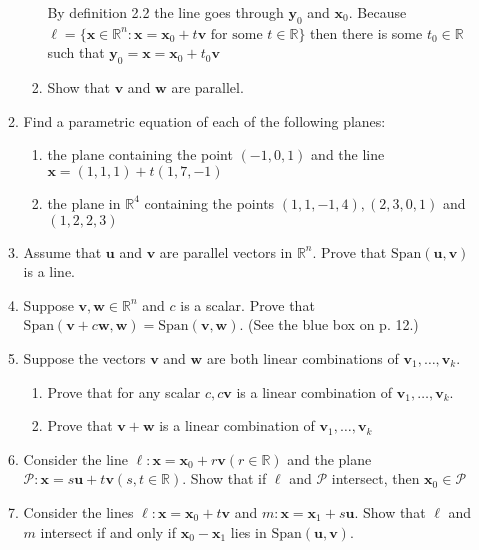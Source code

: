 \documentclass[letterpaper]{article}
\begin{document}
\begin{enumerate}
\begin{enumerate}
\begin{enumerate}
    By definition 2.2 the line goes through $\mathbf{y}_0$ and $\mathbf{x}_0$. Because $\ell=\{\mathbf{x}\in \mathbb{R}^n:\mathbf{x}=\mathbf{x}_0+t\mathbf{v}\text{ for some }t\in \mathbb{R}\}$ then there is some $t_0\in\mathbb{R}$ such that $\mathbf{y}_0=\mathbf{x}=\mathbf{x}_0+t_0\mathbf{v}$
    \item
    Show that $\mathbf{v}$ and $\mathbf{w}$ are parallel.
    \end{enumerate}
  \setcounter{enumii}{9}
  \item
  Find a parametric equation of each of the following planes:
    \begin{enumerate}
    \item
    the plane containing the point $(-1,0,1)$ and the line $\mathbf{x}=(1,1,1)+t(1,7,-1)$
    \setcounter{enumiii}{3}
    \item
    the plane in $\mathbb{R}^4$ containing the points $(1,1,-1,4),(2,3,0,1)$ and $(1,2,2,3)$
    \end{enumerate}
  \setcounter{enumii}{19}
  \item
  Assume that $\mathbf{u}$ and $\mathbf{v}$ are parallel vectors in $\mathbb{R}^n$. Prove that $\text{Span}(\mathbf{u},\mathbf{v})$ is a line.
  \item
  Suppose $\mathbf{v},\mathbf{w}\in \mathbb{R}^n$ and $c$ is a scalar. Prove that $\text{Span}(\mathbf{v}+c\mathbf{w},\mathbf{w})=\text{Span}(\mathbf{v},\mathbf{w})$. (See the blue box on p. 12.)
  \item
  Suppose  the vectors $\mathbf{v}$ and $\mathbf{w}$ are both linear combinations of $\mathbf{v}_1,\dots,\mathbf{v}_k$.
    \begin{enumerate}
    \item
    Prove that for any scalar $c,c\mathbf{v}$ is a linear combination of $\mathbf{v}_1,\dots,\mathbf{v}_k$.
    \item
    Prove that $\mathbf{v}+\mathbf{w}$ is a linear combination of $\mathbf{v}_1,\dots,\mathbf{v}_k$
    \end{enumerate}
  \item
  Consider the line $\ell: \mathbf{x}=\mathbf{x}_0+r\mathbf{v} (r\in \mathbb{R})$ and the plane $\mathcal{P}: \mathbf{x}=s\mathbf{u}+t\mathbf{v} (s,t\in \mathbb{R})$. Show that if $\ell$ and $\mathcal{P}$ intersect, then $\mathbf{x}_0\in \mathcal{P}$
  \item
  Consider the lines $\ell: \mathbf{x}=\mathbf{x}_0+t\mathbf{v}$ and $\mathit{m}: \mathbf{x}=\mathbf{x}_1+s\mathbf{u}$. Show that $\ell$ and $\mathit{m}$ intersect if and only if $\mathbf{x}_0-\mathbf{x}_1$ lies in $\text{Span}(\mathbf{u},\mathbf{v})$.

\end{enumerate}
\end{enumerate}
\end{document}
